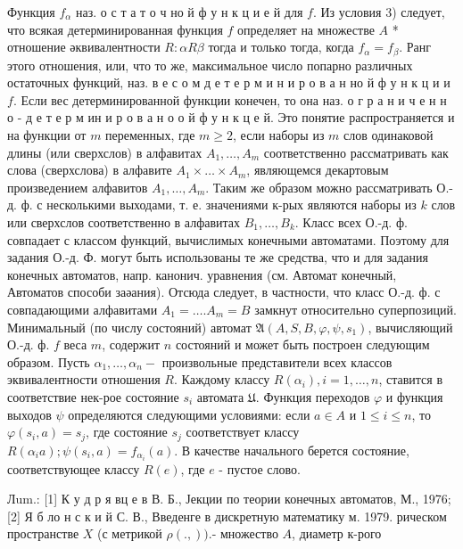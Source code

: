 \documentclass[10pt]{article}
\begin{document}
Функция $f_{\alpha}$ наз. о с т а т о ч но й ф у н к ц и е й для $f$. Из условия 3) следует, что всякая детерминированная функция $f$ определяет на множестве $A$ * отношение әквивалентности $R: \alpha R \beta$ тогда и только тогда, когда $f_{\alpha}=f_{\beta}$. Ранг этого отношения, или, что то же, максимальное число попарно различных остаточных функций, наз. в е с о м д е т е р м и н и р о в а н но й ф у н к ц и и $f$. Если вес детерминированной функции конечен, то она наз. о г р а н и ч е н н о - д е т е р м ин и р о в а н о о й ф у н к ц е й. Это понятие распространяется и на функции от $m$ переменных, где $m \geqslant 2$, если наборы из $m$ слов одинаковой длины (или сверхслов) в алфавитах $A_{1}, \ldots, A_{m}$ соответственно рассматривать как слова (сверхслова) в алфавите $A_{1} \times \ldots \times A_{m}$, являющемся декартовым произведением алфавитов $A_{1}, \ldots, A_{m}$. Таким же образом можно рассматривать О.-д. ф. с несколькими выходами, т. е. значениями к-рых являются наборы из $k$ слов или сверхслов соответственно в алфавитах $B_{1}, \ldots, B_{k}$. Класс всех О.-д. ф. совпадает с классом функций, вычислимых конечными автоматами. Поэтому для задания О.-д. Ф. могут быть использованы те же средства, что и для задания конечных автоматов, напр. канонич. уравнения (см. Автомат конечный, Автоматов способи заәания). Отсюда следует, в частности, что класс О.-д. ф. с совпадающими алфавитами $A_{1}=\ldots . A_{m}=B$ замкнут относительно суперпозиций. Минимальный (по числу состояний) автомат $\mathfrak{A}\left(A, S, B, \varphi, \psi, s_{1}\right)$, вычисляющий О.-д. ф. $f$ веса $m$, содержит $n$ состояний и может быть построен следующим образом. Пусть $\alpha_{1}, \ldots, \alpha_{n}-$ произвольные представители всех классов эквивалентности отношения $R$. Каждому классу $R\left(\alpha_{i}\right), i=1, \ldots, n$, ставится в соответствие нек-рое состояние $s_{i}$ автомата $\mathfrak{U}$. Функция переходов $\varphi$ и функция выходов $\psi$ определяются следующими условиями: если $a \in A$ и $1 \leqslant i \leqslant n$, то $\varphi\left(s_{i}, a\right)=s_{j}$, где состояние $s_{j}$ соответствует классу $R\left(\alpha_{i} a\right) ; \psi\left(s_{i}, a\right)=f_{\alpha_{i}}(a)$. В качестве начального берется состояние, соответствующее классу $R(e)$, где $e$ - пустое слово.



Лum.: [1] К у д р я вц е в В. Б., Јекции по теории конечных автоматов, М., 1976; [2] Я б ло н с к и й С. В., Введенге в дискретную математику м. 1979. рическом пространстве $X$ (с метрикой $\rho(.,))$.- множество $A$, диаметр к-рого
\end{document}
